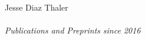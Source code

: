 



\thispagestyle{plain}

\begin{center}
{\Large Jesse Diaz Thaler}\\
~\\
{ \large \it Publications and Preprints since 2016}\\
{ \small \it }
\end{center}


\fancyfoot[c]{\thepage}





\vspace{-.1in}
 


  